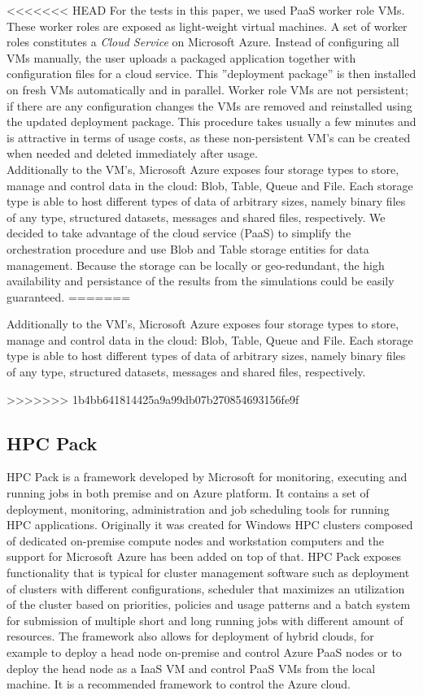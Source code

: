 \documentclass[3p,times]{elsarticle}
\begin{document}
<<<<<<< HEAD
For the tests in this paper, we used PaaS worker role VMs. These worker roles are exposed as light-weight virtual machines. A set of worker roles constitutes a {\it Cloud Service} on Microsoft Azure. Instead of configuring all VMs manually, the user uploads a packaged application together with configuration files for a cloud service. This ''deployment package'' is then installed on fresh VMs automatically and in parallel. Worker role VMs are not persistent; if there are any configuration changes the VMs are removed and reinstalled using the updated deployment package. This procedure takes usually a few minutes and is attractive in terms of usage costs, as these non-persistent VM's can be created when needed and deleted immediately after usage. \\
Additionally to the VM's, Microsoft Azure exposes four storage types to store, manage and control data in the cloud: Blob, Table, Queue and File. Each storage type is able to host different types of data of arbitrary sizes, namely binary files of any type, structured datasets, messages and shared files, respectively. We decided to take advantage of the cloud service (PaaS) to simplify the orchestration procedure and use Blob and Table storage entities for data management. 
Because the storage can be locally or geo-redundant, the high availability and persistance of the results from the simulations could be easily guaranteed.
=======

Additionally to the VM's, Microsoft Azure exposes four storage types to store, manage and control data in the cloud: Blob, Table, Queue and File. Each storage type is able to host different types of data of arbitrary sizes, namely binary files of any type, structured datasets, messages and shared files, respectively. 

>>>>>>> 1b4bb641814425a9a99db07b270854693156fe9f

\subsection{HPC Pack}

HPC Pack is a framework developed by Microsoft for monitoring, executing and running jobs in both premise and on Azure platform. It contains a set of deployment, monitoring, administration and job scheduling tools for running HPC applications. Originally it was created for Windows HPC clusters composed of dedicated on-premise compute nodes and workstation computers and the support for Microsoft Azure has been added on top of that. HPC Pack exposes functionality that is typical for cluster management software such as deployment of clusters with different configurations, scheduler that maximizes an utilization of the cluster based on priorities, policies and usage patterns and a batch system for submission of multiple short and long running jobs with different amount of resources. The framework also allows for deployment of hybrid clouds, for example to deploy a head node on-premise and control Azure PaaS nodes or to deploy the head node as a IaaS VM and control PaaS VMs from the local machine. It is a recommended framework to control the Azure cloud.
\end{document}
